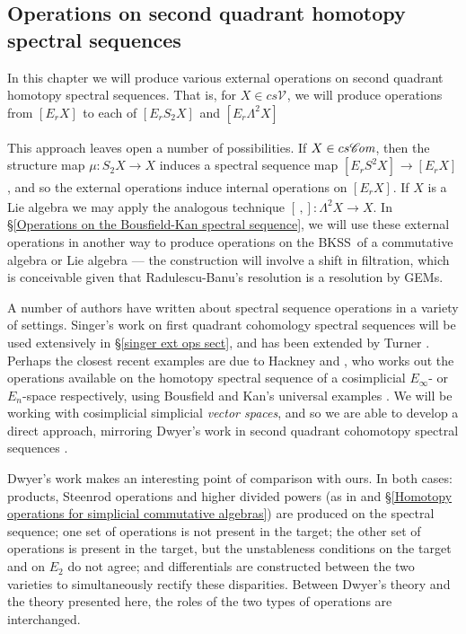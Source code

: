 \documentclass[11pt]{amsart} \renewcommand{\baselinestretch}{1.2}
\theoremstyle{plain}
\numberwithin{equation}{section} %
\theoremstyle{plain}
\numberwithin{equation}{chapter} %
\renewcommand{\to}{\longrightarrow}
\newcommand{\scrC}{\mathscr{C}}
\newcommand{\calV}{\mathcal{V}}
\newcommand{\vect}[2]{\calV^{#1}_{#2}}
\newcommand{\ExtCohOp}{\mathrm{Sq}_\mathrm{ext}}
\newcommand{\hExtCohOp}{\mathrm{Sq}_\mathrm{h,ext}}
\newcommand{\algs}{{\scrC\!\textit{\normalfont\textit{om}}}}
\newcommand{\E}[5]{[E^{#1}_{#2}#3]^{#4}_{#5}}
\newcommand{\uver}{^\mathrm{v}}
\newcommand{\dhor}{_\mathrm{h}}
\newcommand{\BKSS}{BKSS}
\newcommand{\SectionOrChapter}[1]{\section{\textbf{#1}}}
\begin{document}
\begin{second quadrant homotopy sseq operations}

\SectionOrChapter{Operations on second quadrant homotopy spectral sequences}
\label{second quadrant homotopy sseq operations}


In this chapter we will produce various external operations on second quadrant homotopy spectral sequences. That is, for $X\in cs\vect{}{}$, we will produce operations
from $\E{}{r}{X}{}{}$ to each of $\E{}{r}{S_2X}{}{}$ and $\E{}{r}{\Lambda^2 X}{}{}$

 This approach leaves open a number of possibilities. If $X\in cs\algs$, then the structure map $\mu:S_2X\to X$ induces a spectral sequence map $\E{}{r}{S^2X}{}{}\to \E{}{r}{X}{}{}$, and so the external operations induce internal operations on $\E{}{r}{X}{}{}$. If $X$ is a Lie algebra  we may apply the analogous technique $[\,,]:\Lambda^2X\to X$. 
In \S\ref{Operations on the Bousfield-Kan spectral sequence}, we will use these external operations in another way to produce operations on the \BKSS\ of a commutative algebra or Lie algebra --- the construction will involve a shift in filtration, which is conceivable given that  Radulescu-Banu's resolution  is a resolution by GEMs.




A number of authors have written about spectral sequence operations in a variety of settings. Singer's work \cite{MR2245560} on first quadrant cohomology spectral sequences will be used extensively in \S\ref{singer ext ops sect}, and has been extended by Turner \cite{turner_opns_and_sseqs_I.pdf}. 
 Perhaps the closest recent examples are due to Hackney \cite{MR3019742} and \cite{MR3171258}, who works out the operations available on the homotopy spectral sequence of a cosimplicial $E_\infty$- or $E_n$-space respectively, using Bousfield and Kan's universal examples \cite{BK_pairings.pdf}. We will be working with cosimplicial simplicial \emph{vector spaces}, and so we are able to develop a direct approach, mirroring Dwyer's work in second quadrant cohomotopy spectral sequences \cite{DwyerHigherDividedSquares.pdf}. 

Dwyer's work makes an interesting point of comparison with ours. In both cases: products, Steenrod operations and higher divided powers (as in \cite{DwyerHigherDividedSquares.pdf} and \S\ref{Homotopy operations for simplicial commutative algebras}) are produced on the spectral sequence; one set of operations is not present in the target;  the other set of operations is present in the target, but the unstableness conditions on the target and on $E_2$ do not agree; and differentials are constructed between the two varieties to simultaneously rectify these disparities. Between Dwyer's theory and the theory presented here, the roles of the two types of operations are interchanged.


\end{second quadrant homotopy sseq operations}
\end{document}

